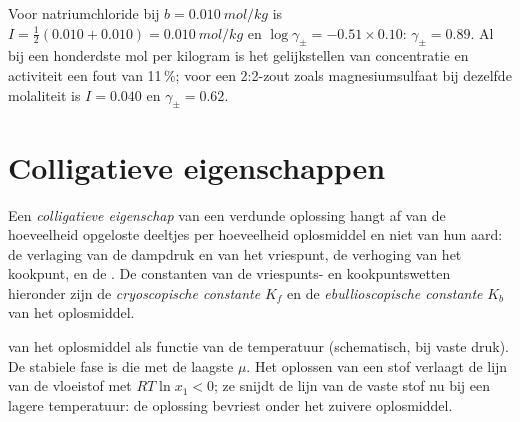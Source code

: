\begin{example}\label{ex:b2:chemical-potential:dh}
Voor natriumchloride bij $b = \qty{0.010}{mol/kg}$ is $I = \frac12(0.010 + 0.010)
= \qty{0.010}{mol/kg}$ en $\log\gamma_\pm = -0.51 \times 0.10$: $\gamma_\pm
= 0.89$. Al bij een honderdste mol per kilogram is het gelijkstellen van
concentratie en activiteit een fout van 11\,\%; voor een 2:2-zout zoals
magnesiumsulfaat bij dezelfde molaliteit is $I = 0.040$ en $\gamma_\pm = 0.62$.
\end{example}

\section{Colligatieve eigenschappen}

\begin{definition}\label{def:b2:chemical-potential:colligative}
Een \emph{colligatieve eigenschap} van een verdunde
oplossing hangt af van de hoeveelheid opgeloste deeltjes per
hoeveelheid oplosmiddel en niet van hun aard: de verlaging van de dampdruk
en van het vriespunt, de verhoging van het kookpunt, en de
. De constanten van de vriespunts- en kookpuntswetten
hieronder zijn de \emph{cryoscopische constante} $K_f$
en de \emph{ebullioscopische constante} $K_b$ van
het oplosmiddel.
\end{definition}

\begin{omfigure}

{\small {} van het oplosmiddel als functie van de temperatuur (schematisch,
bij vaste druk). De stabiele fase is die met de laagste $\mu$. Het oplossen van een
stof verlaagt de lijn van de vloeistof met $RT\ln x_1 < 0$; ze snijdt de lijn van de vaste stof
nu bij een lagere temperatuur: de oplossing bevriest onder het zuivere oplosmiddel.}
\end{omfigure}

